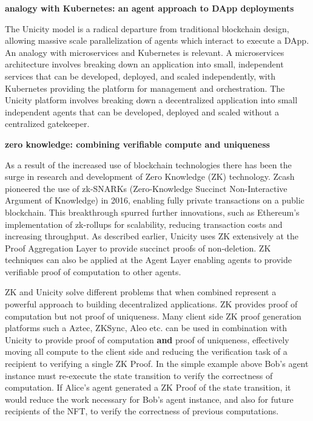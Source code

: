 \documentclass{article}
\begin{document}
\vspace{2mm}
\textbf{analogy with Kubernetes: an agent approach to DApp deployments}
\vspace{2mm}

The Unicity model is a radical departure from traditional blockchain design, allowing massive scale parallelization of agents which interact to execute a DApp. An analogy with microservices and Kubernetes is relevant. A microservices architecture involves breaking down an application into small, independent services that can be developed, deployed, and scaled independently, with Kubernetes providing the platform for management and orchestration. The Unicity platform involves breaking down a decentralized application into small independent agents that can be developed, deployed and scaled without a centralized gatekeeper. 


\vspace{2mm}
\textbf{zero knowledge: combining verifiable compute and  uniqueness}
\vspace{2mm}

As a result of the increased use of blockchain technologies there has been the surge in research and development of Zero Knowledge (ZK) technology. Zcash pioneered the use of zk-SNARKs (Zero-Knowledge Succinct Non-Interactive Argument of Knowledge) in 2016, enabling fully private transactions on a public blockchain. This breakthrough spurred further innovations, such as Ethereum's implementation of zk-rollups for scalability, reducing transaction costs and increasing throughput. As described earlier, Unicity uses ZK extensively at the Proof Aggregation Layer to provide succinct proofs of non-deletion. ZK techniques can also be applied at the Agent Layer enabling agents to provide verifiable proof of computation to other agents.


\vspace{2mm}


ZK and Unicity solve different problems that when combined represent a powerful approach to building decentralized applications. ZK provides proof of computation but not proof of uniqueness. Many client side ZK proof generation platforms such a Aztec, ZKSync, Aleo etc. can be used in combination with Unicity to provide proof of computation \textbf{and} proof of uniqueness, effectively moving all compute to the client side and reducing the verification task of a recipient to verifying a single ZK Proof. In the simple example above Bob's agent instance must re-execute the state transition to verify the correctness of computation. If Alice's agent generated a ZK Proof of the state transition, it would reduce the work necessary for Bob's agent instance, and also for future recipients of the NFT, to verify the correctness of previous computations.
\end{document}

